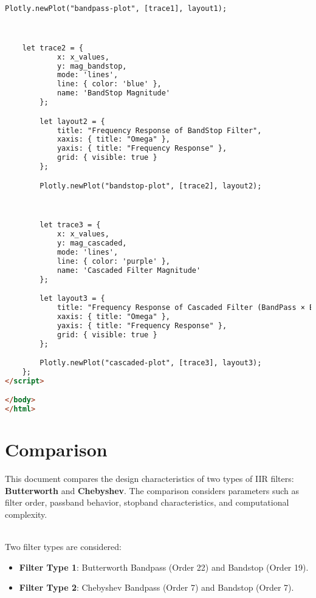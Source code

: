 \documentclass{article}
\begin{document}
\begin{lstlisting}[language=HTML, caption=Filter Type Definition]
        Plotly.newPlot("bandpass-plot", [trace1], layout1);



	let trace2 = {
            x: x_values,
            y: mag_bandstop,
            mode: 'lines',
            line: { color: 'blue' },
            name: 'BandStop Magnitude'
        };

        let layout2 = {
            title: "Frequency Response of BandStop Filter",
            xaxis: { title: "Omega" },
            yaxis: { title: "Frequency Response" },
            grid: { visible: true }
        };

        Plotly.newPlot("bandstop-plot", [trace2], layout2);



        let trace3 = {
            x: x_values,
            y: mag_cascaded,
            mode: 'lines',
            line: { color: 'purple' },
            name: 'Cascaded Filter Magnitude'
        };

        let layout3 = {
            title: "Frequency Response of Cascaded Filter (BandPass × BandStop)",
            xaxis: { title: "Omega" },
            yaxis: { title: "Frequency Response" },
            grid: { visible: true }
        };

        Plotly.newPlot("cascaded-plot", [trace3], layout3);
    };
</script>

</body>
</html>
\end{lstlisting}


\section{Comparison}
This document compares the design characteristics of two types of IIR filters: \textbf{Butterworth} and \textbf{Chebyshev}. The comparison considers parameters such as filter order, passband behavior, stopband characteristics, and computational complexity.

\\
Two filter types are considered:
\begin{itemize}
    \item \textbf{Filter Type 1}: Butterworth Bandpass (Order 22) and Bandstop (Order 19).
    \item \textbf{Filter Type 2}: Chebyshev Bandpass (Order 7) and Bandstop (Order 7).
\end{itemize}
\end{document}
